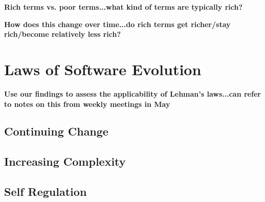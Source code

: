 \textbf{Rich terms vs. poor terms...what kind of terms are typically rich?}

\textbf{How does this change over time...do rich terms get richer/stay rich/become relatively less rich?}


% 
% 

% 
% 

\section{Laws of Software Evolution} %
\label{sec:laws_of_software_evolution}

\textbf{Use our findings to assess the applicability of Lehman's laws...can refer to notes on this from weekly meetings in May}

\subsection{Continuing Change} %
\label{sub:continuing_change}


\subsection{Increasing Complexity} %
\label{sub:increasing_complexity}


\subsection{Self Regulation} %
\label{sub:self_regulation}

